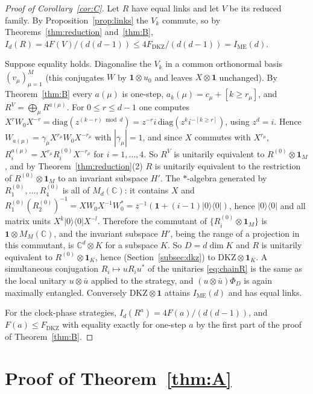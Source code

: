 \documentclass[11pt]{amsart}
\theoremstyle{definition}
\theoremstyle{remark}
\newcommand{\C}{\mathbb{C}}
\newcommand{\FD}{F_{\mathrm{DKZ}}}
\newcommand{\IME}{I_{\mathrm{ME}}}
\newcommand{\one}{\mathbf{1}}
\begin{document}
\begin{proof}[Proof of Corollary~\ref{cor:C}]
Let $R$ have equal links and let $V$ be its reduced family. By Proposition~\ref{prop:links} the $V_k$ commute,
so by Theorems~\ref{thm:reduction} and~\ref{thm:B}, $I_d(R)=4F(V)/(d(d-1))\le4\FD/(d(d-1))=\IME(d)$.

Suppose equality holds. Diagonalise the $V_k$ in a common orthonormal basis $(v_\mu)_{\mu=1}^M$ (this conjugates
$W$ by $\one\otimes u_0$ and leaves $X\otimes\one$ unchanged). By Theorem~\ref{thm:B} every $a(\mu)$ is one-step,
$a_k(\mu)=c_\mu+[k\ge r_\mu]$, and $R^V=\bigoplus_\mu R^{a(\mu)}$. For $0\le r\le d-1$ one computes
$X^rW_0X^{-r}=\mathrm{diag}(z^{(k-r)\bmod d})=z^{-r}i\,\mathrm{diag}(z^ki^{-[k\ge r]})$, using $z^d=i$. Hence
$W_{a(\mu)}=\gamma_\mu X^{r_\mu}W_0X^{-r_\mu}$ with $|\gamma_\mu|=1$, and since $X$ commutes with $X^{r_\mu}$,
$R^{a(\mu)}_i=X^{r_\mu}R^{(0)}_iX^{-r_\mu}$ for $i=1,\dots,4$. So $R^V$ is unitarily equivalent to
$R^{(0)}\otimes\one_M$, and by Theorem~\ref{thm:reduction}(2) $R$ is unitarily equivalent to the restriction of
$R^{(0)}\otimes\one_M$ to an invariant subspace $H'$. The $*$-algebra generated by $R^{(0)}_1,\dots,R^{(0)}_4$ is all of
$M_d(\C)$: it contains $X$ and $R^{(0)}_1(R^{(0)}_2)^{-1}=XW_0X^{-1}W_0^*=z^{-1}(\one+(i-1)|0\rangle\langle0|)$,
hence $|0\rangle\langle0|$ and all matrix units $X^k|0\rangle\langle0|X^{-l}$. Therefore the commutant of
$\{R^{(0)}_i\otimes\one_M\}$ is $\one\otimes M_M(\C)$, and the invariant subspace $H'$, being the range of a
projection in this commutant, is $\C^d\otimes K$ for a subspace $K$. So $D=d\dim K$ and $R$ is unitarily
equivalent to $R^{(0)}\otimes\one_K$, hence (Section~\ref{subsec:dkz}) to $\mathrm{DKZ}\otimes\one_K$.
A simultaneous conjugation $R_i\mapsto uR_iu^*$ of the unitaries \eqref{eq:chainR} is the same as the local unitary
$u\otimes\bar u$ applied to the strategy, and $(u\otimes\bar u)\Phi_D$ is again maximally entangled. Conversely
$\mathrm{DKZ}\otimes\one$ attains $\IME(d)$ and has equal links.

For the clock-phase strategies, $I_d(R^a)=4F(a)/(d(d-1))$, and $F(a)\le\FD$ with equality exactly for one-step $a$
by the first part of the proof of Theorem~\ref{thm:B}.
\end{proof}

\section{Proof of Theorem~\ref{thm:A}}\label{sec:A}
\end{document}
